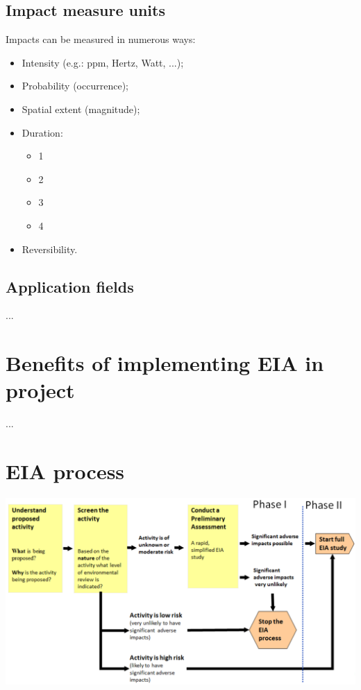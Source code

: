 \documentclass{article}
\begin{document}
\subsection{Impact measure units}
Impacts can be measured in numerous ways:
\begin{itemize}
    \item Intensity (e.g.: ppm, Hertz, Watt, ...);
    \item Probability (occurrence);
    \item Spatial extent (magnitude);
    \item Duration:
    \begin{itemize}
        \item 1
        \item 2
        \item 3
        \item 4
    \end{itemize}
    \item Reversibility.
\end{itemize}

\subsection{Application fields}
...

\section{Benefits of implementing EIA in project}
...

\section{EIA process}
\begin{center}
    \includegraphics[width=.9\textwidth]{media/EIA_process.png}
\end{center}
\end{document}
